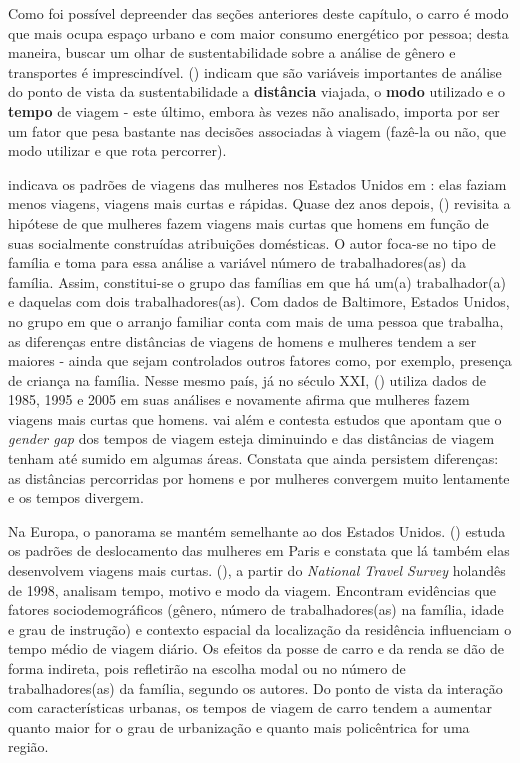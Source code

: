 Como foi possível depreender das seções anteriores deste capítulo, o carro é modo que mais ocupa espaço urbano e com maior consumo energético por pessoa; desta maneira, buscar um olhar de sustentabilidade sobre a análise de gênero e transportes é imprescindível.  (\citeyear{SCHWANEN2002}) indicam que são variáveis importantes de análise do ponto de vista da sustentabilidade a \textbf{distância} viajada, o \textbf{modo} utilizado e o \textbf{tempo} de viagem - este último, embora às vezes não analisado, importa por ser um fator que pesa bastante nas decisões associadas à viagem (fazê-la ou não, que modo utilizar e que rota percorrer).


 


 indicava os padrões de viagens das mulheres nos Estados Unidos em \citeyear{FOX1983}: elas faziam menos viagens, viagens mais curtas e rápidas. Quase dez anos depois,  (\citeyear{IBIPO1992}) revisita a hipótese de que mulheres fazem viagens mais curtas que homens em função de suas socialmente construídas atribuições domésticas. O autor foca-se no tipo de família e toma para essa análise a variável número de trabalhadores(as) da família. Assim, constitui-se o grupo das famílias em que há um(a) trabalhador(a) e daquelas com dois trabalhadores(as). Com dados de Baltimore, Estados Unidos, no grupo em que o arranjo familiar conta com mais de uma pessoa que trabalha, as diferenças entre distâncias de viagens de homens e mulheres tendem a ser maiores - ainda que sejam controlados outros fatores como, por exemplo, presença de criança na família.
Nesse mesmo país, já no século XXI,  (\citeyear{CRANE2007}) utiliza dados de 1985, 1995 e 2005 em suas análises e novamente afirma que mulheres fazem viagens mais curtas que homens.  vai além e contesta estudos que apontam que o \emph{gender gap} dos tempos de viagem esteja diminuindo e das distâncias de viagem tenham até sumido em algumas áreas. Constata que ainda persistem diferenças: as distâncias percorridas por homens e por mulheres convergem muito lentamente e os tempos divergem.

Na Europa, o panorama se mantém semelhante ao dos Estados Unidos.  (\citeyear{FAGNANI1983}) estuda os padrões de deslocamento das mulheres em Paris e constata que lá também elas desenvolvem viagens mais curtas.
 (\citeyear{SCHWANEN2002}), a partir do \emph{National Travel Survey} holandês de 1998, analisam tempo, motivo e modo da viagem. Encontram evidências que fatores sociodemográficos (gênero, número de trabalhadores(as) na família, idade e grau de instrução) e contexto espacial da localização da residência influenciam o tempo médio de viagem diário. Os efeitos da posse de carro e da renda se dão de forma indireta, pois refletirão na escolha modal ou no número de trabalhadores(as) da família, segundo os autores. Do ponto de vista da interação com características urbanas, os tempos de viagem de carro tendem a aumentar quanto maior for o grau de urbanização e quanto mais policêntrica for uma região.

